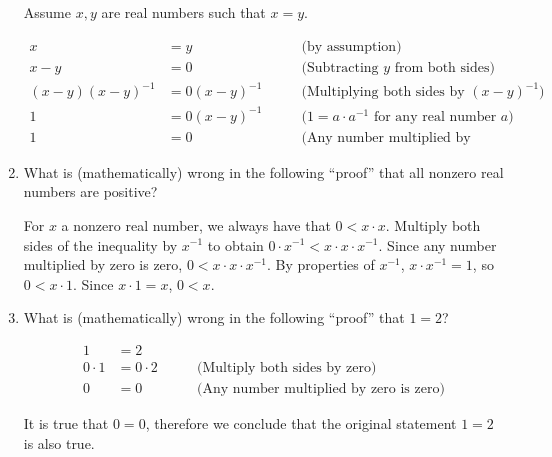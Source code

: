 \documentclass{amsart}
\theoremstyle{definition}
\begin{document}
\begin{enumerate}
Assume $x, y$ are real numbers such that $x = y$.

\begin{align*}
  x &= y \qquad &\text{(by assumption)} \\
  x - y &= 0 \qquad &\text{(Subtracting $y$ from both sides)} \\
  (x - y)(x - y)^{-1} &= 0 (x - y)^{-1} \qquad &\text{(Multiplying both sides by $(x - y)^{-1}$)} \\
  1 &= 0 (x - y)^{-1} \qquad &\text{($1 = a \cdot a^{-1}$ for any real number $a$)} \\
  1 &= 0 \qquad &\text{(Any number multiplied by zero is zero)}
\end{align*}

\item What is (mathematically) wrong in the following ``proof'' that all nonzero real numbers are positive?

  For $x$ a nonzero real number, we always have that $0 < x \cdot x$. Multiply both sides of the inequality by $x^{-1}$ to obtain $0 \cdot x^{-1} < x \cdot x \cdot x^{-1}$. Since any number multiplied by zero is zero, $0 < x \cdot x \cdot x^{-1}$. By properties of $x^{-1}$, $x \cdot x^{-1} = 1$, so $0 < x \cdot 1$. Since $x \cdot 1 = x$, $0 < x$.
\item What is (mathematically) wrong in the following ``proof'' that $1 = 2$?

  \begin{align*}
    1 &= 2 \\
    0 \cdot 1 &= 0 \cdot 2 \qquad & \text{(Multiply both sides by zero)} \\
    0 &= 0 \qquad & \text{(Any number multiplied by zero is zero)}
  \end{align*}

  It is true that $0 = 0$, therefore we conclude that the original statement $1 = 2$ is also true.

  
\end{enumerate}



\end{document}
